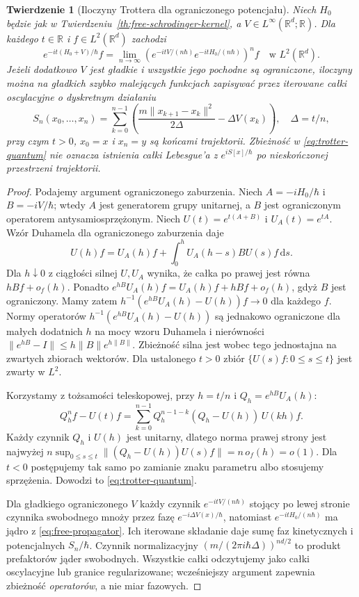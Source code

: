 \documentclass[11pt,a4paper,oneside]{report}
\numberwithin{equation}{chapter}
\theoremstyle{plain}
\newtheorem{twierdzenie}{Twierdzenie}[chapter]
\theoremstyle{definition}
\theoremstyle{remark}
\newcommand{\R}{\mathbb{R}}
\newcommand{\dd}{\mathrm{d}}
\begin{document}
\begin{twierdzenie}[Iloczyny Trottera dla ograniczonego potencjału]\label{thm:volIII:16:04}
\label{th:QM-trotter}
Niech $H_0$ będzie jak w Twierdzeniu~\ref{th:free-schrodinger-kernel},
a $V\in L^\infty(\R^d;\R)$. Dla każdego $t\in\R$
i $f\in L^2(\R^d)$ zachodzi
\[
 e^{-it(H_0+V)/\hbar}f
 =\lim_{n\to\infty}
 \left(e^{-itV/(n\hbar)}e^{-itH_0/(n\hbar)}\right)^n f
 \quad\text{w }L^2(\R^d).
\tag{16.7}\label{eq:trotter-quantum}
\]
Jeżeli dodatkowo $V$ jest gładkie i wszystkie jego
pochodne są ograniczone, iloczyny można na gładkich
szybko malejących funkcjach zapisywać przez iterowane
całki oscylacyjne o dyskretnym działaniu
\[
 S_n(x_0,\ldots,x_n)
 =\sum_{k=0}^{n-1}\left(
    \frac{m\|x_{k+1}-x_k\|^2}{2\Delta}
    -\Delta V(x_k)\right),\quad\Delta=t/n,
\tag{16.8}\label{eq:discrete-action}
\]
przy czym $t>0$, $x_0=x$ i $x_n=y$ są końcami
trajektorii. Zbieżność w \eqref{eq:trotter-quantum}
nie oznacza istnienia całki Lebesgue'a z
$e^{iS[x]/\hbar}$ po nieskończonej przestrzeni trajektorii.
\end{twierdzenie}
\begin{proof}
Podajemy argument ograniczonego zaburzenia.
Niech $A=-iH_0/\hbar$ i $B=-iV/\hbar$; wtedy $A$
jest generatorem grupy unitarnej, a $B$ jest
ograniczonym operatorem antysamiosprzężonym.
Niech $U(t)=e^{t(A+B)}$ i $U_A(t)=e^{tA}$.
Wzór Duhamela dla ograniczonego zaburzenia daje
\[
 U(h)f=U_A(h)f+\int_0^h U_A(h-s)BU(s)f\,\dd s.
\]
Dla $h\downarrow0$ z ciągłości silnej $U,U_A$
wynika, że całka po prawej jest równa
$hBf+o_f(h)$. Ponadto
$e^{hB}U_A(h)f=U_A(h)f+hBf+o_f(h)$,
gdyż $B$ jest ograniczony. Mamy zatem
$h^{-1}(e^{hB}U_A(h)-U(h))f\to0$ dla każdego $f$.
Normy operatorów
$h^{-1}(e^{hB}U_A(h)-U(h))$ są jednakowo
ograniczone dla małych dodatnich $h$ na mocy
wzoru Duhamela i nierówności
$\|e^{hB}-I\|\le h\|B\|e^{h\|B\|}$.
Zbieżność silna jest wobec tego jednostajna na
zwartych zbiorach wektorów. Dla ustalonego $t>0$
zbiór $\{U(s)f:0\le s\le t\}$ jest zwarty w $L^2$.

Korzystamy z tożsamości teleskopowej, przy
$h=t/n$ i $Q_h=e^{hB}U_A(h)$:
\[
 Q_h^n f-U(t)f
 =\sum_{k=0}^{n-1} Q_h^{n-1-k}
   (Q_h-U(h))\,U(kh)f.
\]
Każdy czynnik $Q_h$ i $U(h)$ jest unitarny, dlatego
norma prawej strony jest najwyżej
$n\sup_{0\le s\le t}\|(Q_h-U(h))U(s)f\|=n\,o_f(h)=o(1)$.
Dla $t<0$ postępujemy tak samo po zamianie znaku
parametru albo stosujemy sprzężenia. Dowodzi to
\eqref{eq:trotter-quantum}.

Dla gładkiego ograniczonego $V$ każdy czynnik
$e^{-itV/(n\hbar)}$ stojący po lewej stronie czynnika
swobodnego mnoży przez fazę
$e^{-i\Delta V(x)/\hbar}$, natomiast
$e^{-itH_0/(n\hbar)}$ ma jądro z
\eqref{eq:free-propagator}. Ich iterowane składanie daje
sumę faz kinetycznych i potencjalnych
$S_n/\hbar$. Czynnik normalizacyjny
$(m/(2\pi i\hbar\Delta))^{nd/2}$ to produkt
prefaktorów jąder swobodnych. Wszystkie całki
odczytujemy jako całki oscylacyjne lub granice
regularizowane; wcześniejszy argument zapewnia
zbieżność \emph{operatorów}, a nie miar fazowych.
\end{proof}
\end{document}
